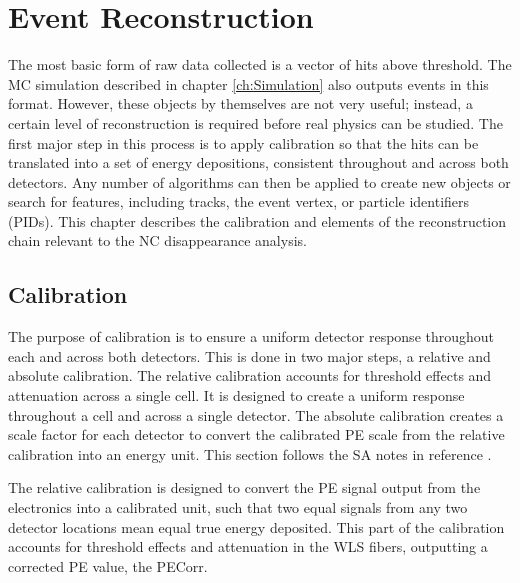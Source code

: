 \chapter{Event Reconstruction}
\label{ch:RecoCal}

The most basic form of raw data collected is a vector of hits above threshold. The MC simulation described in chapter \ref{ch:Simulation} also outputs events in this format. However, these objects by themselves are not very useful; instead, a certain level of reconstruction is required before real physics can be studied. The first major step in this process is to apply calibration so that the hits can be translated into a set of energy depositions, consistent throughout and across both detectors. Any number of algorithms can then be applied to create new objects or search for features, including tracks, the event vertex, or particle identifiers (PIDs). This chapter describes the calibration and elements of the reconstruction chain relevant to the NC disappearance analysis.

\section{Calibration}

The purpose of calibration is to ensure a uniform detector response throughout each and across both detectors. This is done in two major steps, a relative and absolute calibration. The relative calibration accounts for threshold effects and attenuation across a single cell. It is designed to create a uniform response throughout a cell and across a single detector. The absolute calibration creates a scale factor for each detector to convert the calibrated PE scale from the relative calibration into an energy unit. This section follows the SA notes in reference \cite{ref:TNCalib}.

The relative calibration is designed to convert the PE signal output from the electronics into a calibrated unit, such that two equal signals from any two detector locations mean equal true energy deposited. This part of the calibration accounts for threshold effects and attenuation in the WLS fibers, outputting a corrected PE value, the PECorr.

